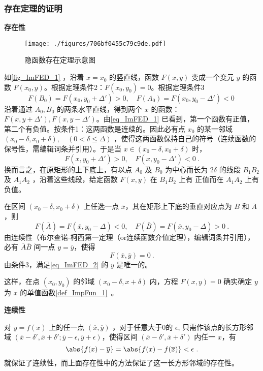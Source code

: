 \subsubsection{存在定理的证明}
\textbf{存在性}
\begin{figure}[ht]
\centering
\texttt{[image: ./figures/706bf0455c79c9de.pdf]}
\caption{隐函数存在定理示意图} \label{fig_ImFED_1}
\end{figure}
如\autoref{fig_ImFED_1} ，沿着 $x=x_0$ 的竖直线，函数 $F(x,y)$ 变成一个变元 $y$ 的函数 $F(x_0,y)$。根据定理条件2：$F(x_0,y_0)=0$。根据定理条件3
\begin{equation}\label{eq_ImFED_1}
F(B_0)=F(x_0,y_0+\Delta')>0,\quad F(A_0)=F(x_0,y_0-\Delta')<0~
\end{equation}
沿着通过 $A_0,B_0$ 的两条水平直线，得到两个 $x$ 的函数：$F(x,y+\Delta'),F(x,y-\Delta')$。由\autoref{eq_ImFED_1} 已看到，第一个函数有正值，第二个有负值。按条件1：这两函数是连续的。因此必有点 $x_0$ 的某一邻域 $(x_0-\delta,x_0+\delta),\quad(0<\delta\leq\Delta)$ ，使得这两函数保持自己的符号（连续函数的保号性，需编辑词条并引用）。于是当 $x\in(x_0-\delta,x_0+\delta)$ 时，
\begin{equation}
F(x,y_0+\Delta')>0,\quad F(x,y_0-\Delta')<0~.
\end{equation}
换而言之，在原矩形的上下底上，有以点 $A_0$ 及 $B_0$ 为中心而长为 $2\delta$ 的线段  $B_1B_2$ 及 $A_1A_2$ ，沿着这些线段，给定函数 $F(x,y)$ 在 $B_1B_2$ 上有 正值而在 $A_1A_2$ 上有负值。

在区间 $(x_0-\delta,x_0+\delta)$ 上任选一点 $\overline{x}$，其在矩形上下底的垂直对应点为 $\overline{B}$ 和 $\overline{A}$，则
\begin{equation}
F(\overline{A})=F(\overline{x},y_0-\Delta)<0,\quad F(\overline{B})=F(\overline{x},y_0-\Delta)>0~.
\end{equation}
由连续性（布尔查诺-柯西第一定理（or连续函数介值定理），编辑词条并引用），必有 $\overline{A}\overline{B}$ 间一点 $y=\overline{y}$，使得
\begin{equation}\label{eq_ImFED_2}
F(\overline{x},\overline{y})=0~.
\end{equation}
由条件3，满足\autoref{eq_ImFED_2} 的 $\overline{y}$ 是唯一的。

这样，在点 $(x_0,y_0)$ 的邻域 $(x_0-\delta,x+\delta)$ 内，方程 $F(x,y)=0$ 确实确定 $y$ 为 $x$ 的单值函数\autoref{def_ImpFun_1}~。

\textbf{连续性}

对 $y=f(x)$ 上的任一点 $(\overline{x},\overline{y})$ ，对于任意大于0的 $\epsilon$, 只需作该点的长方形邻域 $(\overline{x}-\delta',\overline{x}+\delta';\overline{y}-\epsilon,\overline{y}+\epsilon)$，使得区间 $(\overline{x}-\delta',\overline{x}+\delta')$ 内任一 $x$，有
\begin{equation}
\abs{f(x)-\overline{y}}=\abs{f(x)-f(\overline{x})}<\epsilon~.
\end{equation}
就保证了连续性，而上面存在性中的方法保证了这一长方形邻域的存在性。

